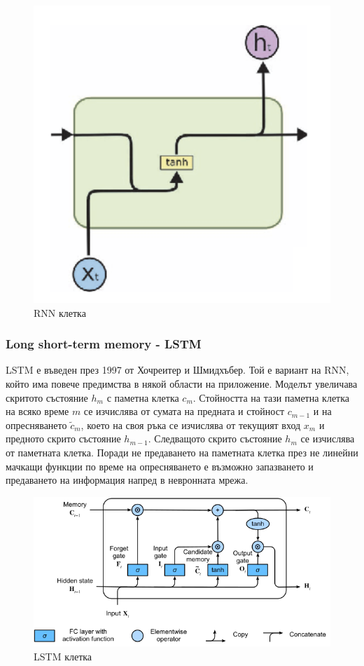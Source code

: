 \documentclass{article}
\begin{document}
    \begin{figure}[H]
        \centering
        \captionsetup{justification=centering}
        \includegraphics[width=450px, keepaspectratio]{chapter-03/rnn.png}
        \caption{RNN клетка}
    \end{figure}

    \subsubsection{Long short-term memory - LSTM}

    LSTM е въведен през 1997 от Хочреитер и Шмидхъбер. Той е вариант на RNN, който има повече предимства в някой области на
    приложение. Моделът увеличава скритото състояние $h_m$ с паметна клетка $c_m$. Стойността на тази паметна клетка на
    всяко време $m$ се изчислява от сумата на предната и стойност $c_{m{-}1}$ и на опресняването $\tilde{c}_m$, което на
    своя ръка се изчислява от текущият вход $x_m$ и предното скрито състояние $h_{m{-}1}$. Следващото скрито състояние
    $h_m$ се изчислява от паметната клетка. Поради не предаването на паметната клетка през не линейни мачкащи функции по
    време на опресняването е възможно запазването и предаването на информация напред в невронната мрежа.
    \cite{intro-to-nlp-mit}

    \begin{figure}[H]
        \centering
        \captionsetup{justification=centering}
        \includegraphics[width=450px, keepaspectratio]{chapter-03/lstm.png}
        \caption{LSTM клетка}
    \end{figure}
\end{document}
